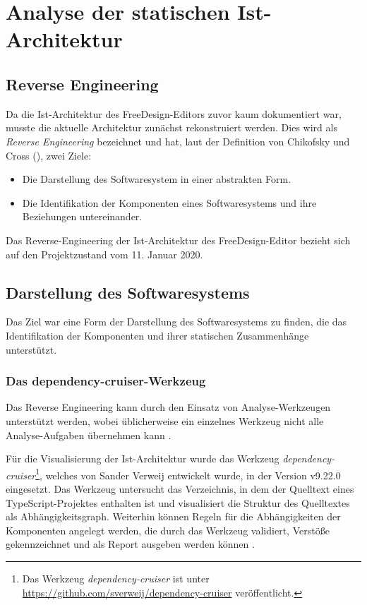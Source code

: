 

\section{Analyse der statischen Ist-Architektur}

\subsection{Reverse Engineering}
Da die Ist-Architektur des FreeDesign-Editors zuvor kaum dokumentiert war, musste die aktuelle Architektur zunächst rekonstruiert werden. 
Dies wird als \emph{Reverse Engineering} bezeichnet und hat, laut der Definition von Chikofsky und Cross (\citeyear[S. 13-17]{Chikofsky1990}), zwei Ziele: 
\begin{itemize}
    \item Die Darstellung des Softwaresystem in einer abstrakten Form. 
    \item Die Identifikation der Komponenten eines Softwaresystems und ihre Beziehungen untereinander. 
\end{itemize}
Das Reverse-Engineering der Ist-Architektur des FreeDesign-Editor bezieht sich auf den Projektzustand vom 11. Januar 2020. 

\subsection{Darstellung des Softwaresystems}
Das Ziel war eine Form der Darstellung des Softwaresystems zu finden, die das Identifikation der Komponenten und ihrer statischen Zusammenhänge unterstützt.

\subsubsection{Das {dependency-cruiser}-Werkzeug}
Das Reverse Engineering kann durch den Einsatz von Analyse-Werkzeugen unterstützt werden, wobei üblicherweise ein einzelnes Werkzeug nicht alle Analyse-Aufgaben übernehmen kann \autocite[vgl.][381]{Bass2013}.  

Für die Visualisierung der Ist-Architektur wurde das Werkzeug \emph{dependency-cruiser}\footnote{Das Werkzeug \emph{dependency-cruiser} ist unter \url{https://github.com/sverweij/dependency-cruiser} veröffentlicht.}, welches von Sander Verweij entwickelt wurde, in der Version v9.22.0 eingesetzt. 
Das Werkzeug untersucht das Verzeichnis, in dem der Quelltext eines TypeScript-Projektes enthalten ist und visualisiert die Struktur des Quelltextes als Abhängigkeitsgraph. Weiterhin können Regeln für die Abhängigkeiten der Komponenten angelegt werden, die durch das Werkzeug validiert, Verstöße gekennzeichnet und als Report ausgeben werden können \autocite[vgl.][]{Verweij:Dependency}. 

